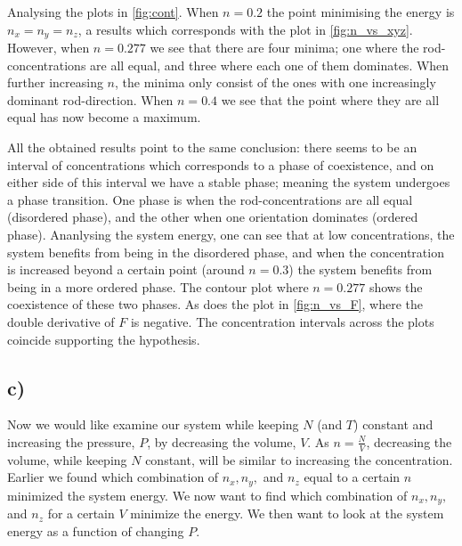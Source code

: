    Analysing the plots in \cref{fig:cont}. When $n=0.2$ the point minimising the energy is $n_x = n_y = n_z$, a results which corresponds with the plot in \cref{fig:n_vs_xyz}. However, when $n=0.277$ we see that there are four minima; one where the rod-concentrations are all equal, and three where each one of them dominates. When further increasing $n$, the minima only consist of the ones with one increasingly dominant rod-direction. When $n=0.4$ we see that the point where they are all equal has now become a maximum. 

    All the obtained results point to the same conclusion: there seems to be an interval of concentrations which corresponds to a phase of coexistence, and on either side of this interval we have a stable phase; meaning the system undergoes a phase transition. One phase is when the rod-concentrations are all equal (disordered phase), and the other when one orientation dominates (ordered phase). Ananlysing the system energy, one can see that at low concentrations, the system benefits from being in the disordered phase, and when the concentration is increased beyond a certain point (around $n=0.3$) the system benefits from being in a more ordered phase. The contour plot where $n=0.277$ shows the coexistence of these two phases. As does the plot in \cref{fig:n_vs_F}, where the double derivative of $F$ is negative. The concentration intervals across the plots coincide supporting the hypothesis.  



\subsection*{c)}
    Now we would like examine our system while keeping $N$ (and $T$) constant and increasing the pressure, $P$, by decreasing the volume, $V$. As $n = \frac{N}{V}$, decreasing the volume, while keeping $N$ constant, will be similar to increasing the concentration. Earlier we found which combination of $n_x, n_y,$ and $n_z$ equal to a certain $n$ minimized the system energy. We now want to find which combination of $n_x, n_y,$ and $n_z$ for a certain $V$ minimize the energy. We then want to look at the system energy as a function of changing $P$. 
    
